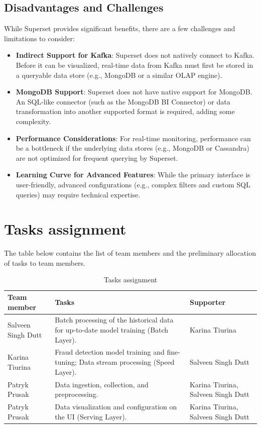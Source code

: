 \documentclass[12pt,a4paper, hidelinks]{article}
\begin{document}
\subsection{Disadvantages and Challenges}
While Superset provides significant benefits, there are a few challenges and limitations to consider:
\begin{itemize}
    \item \textbf{Indirect Support for Kafka}: Superset does not natively connect to Kafka. Before it can be visualized, real-time data from Kafka must first be stored in a queryable data store (e.g., MongoDB or a similar OLAP engine).
    \item \textbf{MongoDB Support}: Superset does not have native support for MongoDB. An SQL-like connector (such as the MongoDB BI Connector) or data transformation into another supported format is required, adding some complexity.
    \item \textbf{Performance Considerations}: For real-time monitoring, performance can be a bottleneck if the underlying data stores (e.g., MongoDB or Cassandra) are not optimized for frequent querying by Superset.
    \item \textbf{Learning Curve for Advanced Features}: While the primary interface is user-friendly, advanced configurations (e.g., complex filters and custom SQL queries) may require technical expertise.
\end{itemize}


\section{Tasks assignment}

The table below contains the list of team members and the preliminary allocation of tasks to team members.

\begin{table}[htbp]
\centering
\begin{tabular}{|p{4cm}|p{6.5cm}|p{4cm}|}
\hline
\textbf{Team member} & \textbf{Tasks} & \textbf{Supporter} \\
\hline
Salveen Singh Dutt & Batch processing of the historical data for up-to-date model training (Batch Layer). & Karina Tiurina \\
\hline
Karina Tiurina & Fraud detection model training and fine-tuning; Data stream processing (Speed Layer). & Salveen Singh Dutt \\
\hline
Patryk Prusak & Data ingestion, collection, and preprocessing. & Karina Tiurina, Salveen Singh Dutt  \\
\hline
Patryk Prusak & Data visualization and configuration on the UI (Serving Layer). & Karina Tiurina, Salveen Singh Dutt \\
\hline
\end{tabular}
\caption{Tasks assignment}
\end{table}
\end{document}
